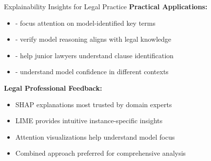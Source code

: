 \begin{frame}{Explainability Insights for Legal Practice}
\textbf{Practical Applications:}
\begin{itemize}
    \item {} - focus attention on model-identified key terms
    \item {} - verify model reasoning aligns with legal knowledge
    \item {} - help junior lawyers understand clause identification
    \item {} - understand model confidence in different contexts
\end{itemize}

\vspace{0.5cm}
\textbf{Legal Professional Feedback:}
\begin{itemize}
    \item SHAP explanations most trusted by domain experts
    \item LIME provides intuitive instance-specific insights
    \item Attention visualizations help understand model focus
    \item Combined approach preferred for comprehensive analysis
\end{itemize}
\end{frame}
